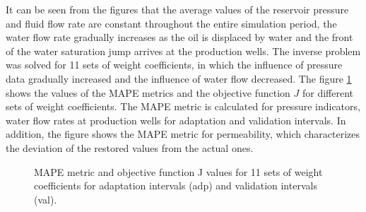 \documentclass[
11pt,%
tightenlines,%
twoside,%
onecolumn,%
nofloats,%
nobibnotes,%
nofootinbib,%
superscriptaddress,%
noshowpacs,%
centertags]%
{revtex4}
\begin{document}
It can be seen from the figures that the average values of the reservoir pressure and fluid flow rate are constant throughout the entire simulation period, the water flow rate gradually increases as the oil is displaced by water and the front of the water saturation jump arrives at the production wells.
The inverse problem was solved for 11 sets of weight coefficients, in which the influence of pressure data gradually increased and the influence of water flow decreased. The figure \ref{fig:wp} shows the values of the MAPE metrics and the objective function $J$ for different sets of weight coefficients. The MAPE metric is calculated for pressure indicators, water flow rates at production wells for adaptation and validation intervals. In addition, the figure shows the MAPE metric for permeability, which characterizes the deviation of the restored values from the actual ones.

\begin{figure}
	\caption{MAPE metric and objective function J values for 11 sets of weight coefficients for adaptation intervals (adp) and validation intervals (val).}
	\label{fig:wp}
\end{figure}
\end{document}
